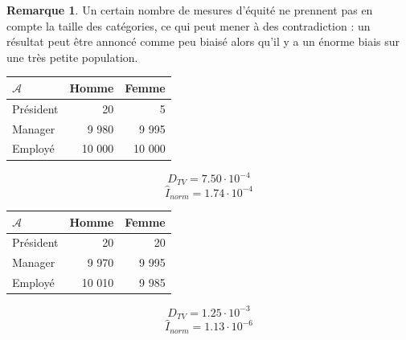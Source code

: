 \documentclass[draft]{article}
\theoremstyle{definition}
\newtheorem{myRem}{Remarque}
\begin{document}
\begin{myRem}
  Un certain nombre de mesures d'équité ne prennent pas en compte la taille des catégories, ce qui peut mener à des contradiction : un résultat peut être annoncé comme peu biaisé alors qu'il y a un énorme biais sur une très petite population.

  \begin{multicols}{2}
    \begin{tabular}{l|r|r}
      $\mathcal{A}$ & Homme & Femme \\
      \hline
      Président & 20 & 5 \\
      Manager & 9 980 & 9 995 \\
      Employé & 10 000 & 10 000 \\
    \end{tabular}
    \[
    D_{TV} = 7.50 \cdot 10^{-4}
    \]
    \[
    \hat{I}_{norm} = 1.74 \cdot 10^{-4}
    \]

    \columnbreak

    \begin{tabular}{l|r|r}
      $\mathcal{A}$ & Homme & Femme \\
      \hline
      Président & 20 & 20 \\
      Manager & 9 970 & 9 995 \\
      Employé & 10 010 & 9 985 \\
    \end{tabular}
    \[
    D_{TV} = 1.25 \cdot 10^{-3}
    \]
    \[
    \hat{I}_{norm} = 1.13 \cdot 10^{-6}
    \]
  \end{multicols}
\end{myRem}
\end{document}
